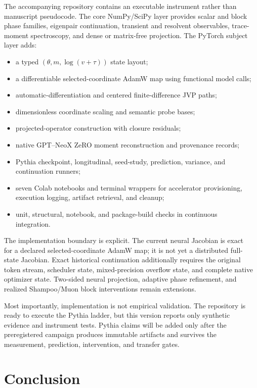 The accompanying repository contains an executable instrument rather than manuscript pseudocode.  The core NumPy/SciPy layer provides scalar and block phase families, eigenpair continuation, transient and resolvent observables, trace-moment spectroscopy, and dense or matrix-free projection.  The PyTorch subject layer adds:
\begin{itemize}[leftmargin=1.5em]
\item a typed \((\theta,m,\log(v+\tau))\) state layout;
\item a differentiable selected-coordinate AdamW map using functional model calls;
\item automatic-differentiation and centered finite-difference JVP paths;
\item dimensionless coordinate scaling and semantic probe bases;
\item projected-operator construction with closure residuals;
\item native GPT--NeoX ZeRO moment reconstruction and provenance records;
\item Pythia checkpoint, longitudinal, seed-study, prediction, variance, and continuation runners;
\item seven Colab notebooks and terminal wrappers for accelerator provisioning, execution logging, artifact retrieval, and cleanup;
\item unit, structural, notebook, and package-build checks in continuous integration.
\end{itemize}

The implementation boundary is explicit.  The current neural Jacobian is exact for a declared selected-coordinate AdamW map; it is not yet a distributed full-state Jacobian.  Exact historical continuation additionally requires the original token stream, scheduler state, mixed-precision overflow state, and complete native optimizer state.  Two-sided neural projection, adaptive phase refinement, and realized Shampoo/Muon block interventions remain extensions.

Most importantly, implementation is not empirical validation.  The repository is ready to execute the Pythia ladder, but this version reports only synthetic evidence and instrument tests.  Pythia claims will be added only after the preregistered campaign produces immutable artifacts and survives the measurement, prediction, intervention, and transfer gates.

\section{Conclusion}

